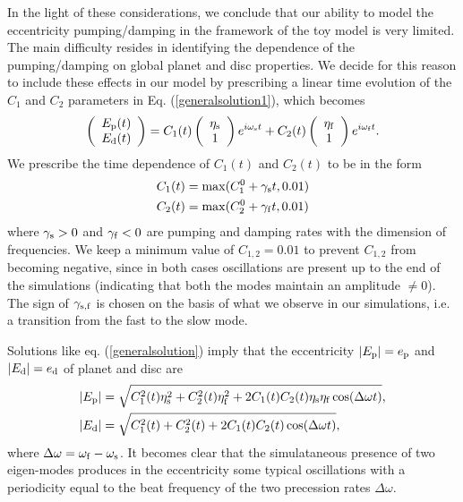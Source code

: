 \documentclass[usenatbib,a4paper,times,fleqn]{mnras}
\begin{document}
In the light of these considerations, we conclude that our ability to model the eccentricity pumping/damping in the framework of the toy model is very limited. The main difficulty resides in identifying the dependence of the pumping/damping on global planet and disc properties.
We decide for this reason to include these effects in our model by prescribing a linear time evolution of the $C_1$ and $C_2$ parameters in Eq. (\ref{generalsolution1}), which becomes
\begin{equation}
   \left(\begin{array}{c}
   E_{\rm p}(t)\\
   E_{\rm d}(t)
   \end{array}\right)=C_1(t)\left(\begin{array}{c}
 \eta_{\rm s}\\
 1 
\end{array}\right)e^{i\omega_{\rm s}t}+C_2(t)\left(\begin{array}{c}
 \eta_{\rm f}\\
 1 
\end{array}
\right) e^{i\omega_{\rm f}t}.\label{generalsolution}
\end{equation}
We prescribe the time dependence of $C_1(t)$ and $C_2(t)$ to be in the form
\begin{align}
C_1(t)&=\max(C^0_1+\gamma_{\rm s}t,0.01)\label{pdump1}\\
C_2(t)&=\max(C^0_2+\gamma_{\rm f}t,0.01)\label{pdump2}
\end{align}
where $\gamma_{\rm s}>0$ and $\gamma_{\rm f}<0$ are pumping and damping rates with the dimension of frequencies. We keep a minimum value of $C_{1,2}=0.01$ to prevent $C_{1,2}$ from becoming negative, since in both cases oscillations are present up to the end of the simulations (indicating that both the modes maintain an amplitude $\neq 0$). The sign of $\gamma_{\rm s,f}$ is chosen on the basis of what we observe in our simulations, i.e. a transition from the fast to the slow mode. 

Solutions like eq. (\ref{generalsolution}) imply that the eccentricity $|E_{\rm p}|=e_{\rm p}$ and $|E_{\rm d}|=e_{\rm d}$ of planet and disc are
\begin{align}
|E_{\rm p}|&=\sqrt{C_1^2(t)\eta_{\rm s}^2+C_2^2(t)\eta_{\rm f}^2+2C_1(t)C_2(t)\eta_{\rm s}\eta_{\rm f}\cos(\Delta\omega t)},\label{eccp}\\
|E_{\rm d}|&=\sqrt{C_1^2(t)+C_2^2(t)+2C_1(t)C_2(t)\cos(\Delta\omega t)},\label{eccd}
\end{align}
where $\Delta\omega=\omega_{\rm f}-\omega_{\rm s}$. It becomes clear that the simulataneous presence of two eigen-modes produces in the eccentricity some typical oscillations with a periodicity equal to the beat frequency of the two precession rates $\Delta\omega$. 
 
\end{document}
